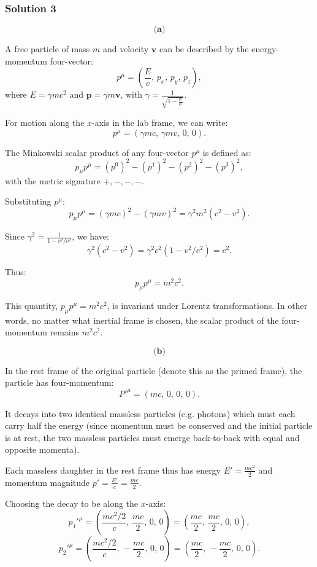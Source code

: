 \documentclass{article}
\begin{document}
\subsubsection{Solution 3}
\[
\textbf{(a)}
\]

A free particle of mass \(m\) and velocity \(\mathbf{v}\) can be described by the energy-momentum four-vector:
\[
p^\mu = \left(\frac{E}{c},\, p_x,\, p_y,\, p_z\right),
\]
where \(E = \gamma m c^2\) and \(\mathbf{p} = \gamma m \mathbf{v}\), with \(\gamma = \frac{1}{\sqrt{1 - \frac{v^2}{c^2}}}\).

For motion along the \(x\)-axis in the lab frame, we can write:
\[
p^\mu = (\gamma m c,\, \gamma m v,\, 0,\, 0).
\]

The Minkowski scalar product of any four-vector \(p^\mu\) is defined as:
\[
p_\mu p^\mu = (p^0)^2 - (p^1)^2 - (p^2)^2 - (p^3)^2,
\]
with the metric signature \(+,-,-,-\).

Substituting \(p^\mu\):
\[
p_\mu p^\mu = (\gamma m c)^2 - (\gamma m v)^2 = \gamma^2 m^2 (c^2 - v^2).
\]

Since \(\gamma^2 = \frac{1}{1 - v^2/c^2}\), we have:
\[
\gamma^2 (c^2 - v^2) = \gamma^2 c^2 (1 - v^2/c^2) = c^2.
\]

Thus:
\[
p_\mu p^\mu = m^2 c^2.
\]

This quantity, \(p_\mu p^\mu = m^2 c^2\), is invariant under Lorentz transformations. In other words, no matter what inertial frame is chosen, the scalar product of the four-momentum remains \(m^2 c^2\).

\[
\textbf{(b)}
\]

In the rest frame of the original particle (denote this as the primed frame), the particle has four-momentum:
\[
P'^\mu = (m c,\, 0,\, 0,\, 0).
\]

It decays into two identical massless particles (e.g. photons) which must each carry half the energy (since momentum must be conserved and the initial particle is at rest, the two massless particles must emerge back-to-back with equal and opposite momenta).

Each massless daughter in the rest frame thus has energy \(E' = \frac{m c^2}{2}\) and momentum magnitude \(p' = \frac{E'}{c} = \frac{m c}{2}\).

Choosing the decay to be along the \(x\)-axis:
\[
p_1'^\mu = \left(\frac{m c^2/2}{c},\, \frac{m c}{2},\, 0,\, 0\right) = \left(\frac{m c}{2},\, \frac{m c}{2},\, 0,\, 0\right),
\]
\[
p_2'^\mu = \left(\frac{m c^2/2}{c},\, -\frac{m c}{2},\, 0,\, 0\right) = \left(\frac{m c}{2},\, -\frac{m c}{2},\, 0,\, 0\right).
\]
\end{document}
